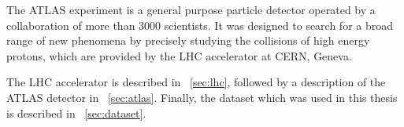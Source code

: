 
The ATLAS experiment is a general purpose particle detector operated by a collaboration of 
more than 3000 scientists. It was designed to search for a broad range of new phenomena by 
precisely studying the collisions of high energy protons, which are provided by the 
\ac{LHC} accelerator at CERN, Geneva.

The \ac{LHC} accelerator is described in \Section~\ref{sec:lhc}, followed by a description 
of the ATLAS detector in \Section~\ref{sec:atlas}. Finally, the dataset which was 
used in this thesis is described in \Section~\ref{sec:dataset}.
